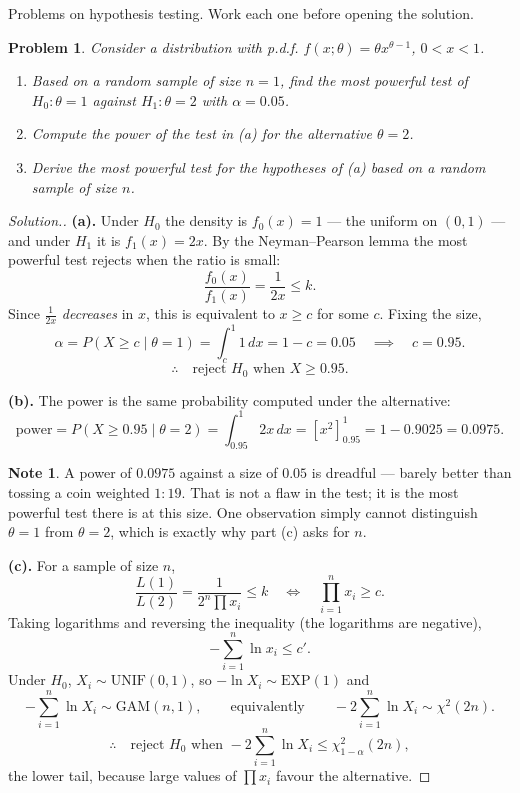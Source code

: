 \documentclass[12pt,a4paper]{report}
\theoremstyle{definition}
\newtheorem{note}[thm]{Note}
\theoremstyle{plain}
\newtheorem{problemx}{Problem}[section]
\newenvironment{problem}{\begin{problemx}}{\end{problemx}}
\newenvironment{solution}
  {\renewcommand{\qedsymbol}{}\begin{proof}[\textit{Solution}.]}
  {\end{proof}}
\begin{document}
Problems on hypothesis testing. Work each one before opening the
solution.

\begin{problem}
Consider a distribution with p.d.f. $f(x;\theta)=\theta x^{\theta-1}$, $0<x<1$.
\begin{enumerate}
\item[(a).] Based on a random sample of size $n=1$, find the most powerful test of
$H_0:\theta=1$ against $H_1:\theta=2$ with $\alpha=0.05$.
\item[(b).] Compute the power of the test in (a) for the alternative $\theta=2$.
\item[(c).] Derive the most powerful test for the hypotheses of (a) based on a
random sample of size $n$.
\end{enumerate}
\end{problem}

\begin{solution}
\textbf{(a).} Under $H_0$ the density is $f_0(x)=1$ --- the uniform on $(0,1)$ ---
and under $H_1$ it is $f_1(x)=2x$. By the Neyman--Pearson lemma the most powerful
test rejects when the ratio is small:
\[\frac{f_0(x)}{f_1(x)}=\frac{1}{2x}\leq k.\]
Since $\frac{1}{2x}$ \emph{decreases} in $x$, this is equivalent to $x\geq c$ for
some $c$. Fixing the size,
\[\alpha=P(X\geq c\mid\theta=1)=\int_c^1 1\,dx=1-c=0.05
\quad\implies\quad c=0.95.\]
\[\therefore\quad \text{reject } H_0 \text{ when } X\geq 0.95.\]

\textbf{(b).} The power is the same probability computed under the alternative:
\[\text{power}=P(X\geq 0.95\mid\theta=2)=\int_{0.95}^1 2x\,dx
=\left[x^2\right]_{0.95}^1=1-0.9025=0.0975.\]

\begin{note}
A power of $0.0975$ against a size of $0.05$ is dreadful --- barely better than
tossing a coin weighted $1:19$. That is not a flaw in the test; it is the most
powerful test there is at this size. One observation simply cannot distinguish
$\theta=1$ from $\theta=2$, which is exactly why part (c) asks for $n$.
\end{note}

\textbf{(c).} For a sample of size $n$,
\[\frac{L(1)}{L(2)}=\frac{1}{2^n\prod x_i}\leq k
\quad\Longleftrightarrow\quad \prod_{i=1}^n x_i\geq c.\]
Taking logarithms and reversing the inequality (the logarithms are negative),
\[-\sum_{i=1}^n\ln x_i\leq c'.\]
Under $H_0$, $X_i\sim\text{UNIF}(0,1)$, so $-\ln X_i\sim\text{EXP}(1)$ and
\[-\sum_{i=1}^n\ln X_i\sim\text{GAM}(n,1),\qquad\text{equivalently}\qquad
-2\sum_{i=1}^n\ln X_i\sim\chi^2(2n).\]
\[\therefore\quad\text{reject } H_0 \text{ when }
-2\sum_{i=1}^n\ln X_i\leq\chi^2_{1-\alpha}(2n),\]
the lower tail, because large values of $\prod x_i$ favour the alternative.
\end{solution}
\end{document}
